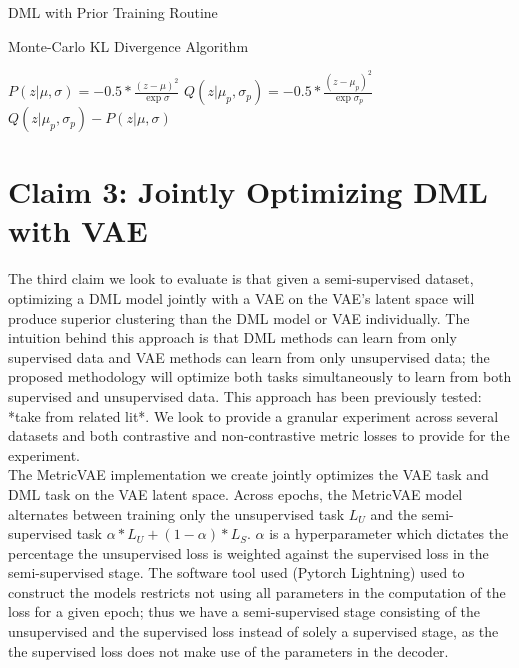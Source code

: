 \documentclass[./dissertation.tex]{subfiles}
\begin{document}
    \begin{algorithm}
    \caption{DML with Prior Training Routine}\label{alg:two}
    \end{algorithm}
    \begin{algorithm}
    \caption{Monte-Carlo KL Divergence Algorithm}\label{alg:two}
    $P(z|\mu, \sigma) = -0.5 * \frac{(z - \mu)^{2}}{\exp{\sigma}}$\;
    $Q(z|\mu_{p}, \sigma_{p}) = -0.5 * \frac{(z - \mu_{p})^{2}}{\exp{\sigma_{p}}}$\;
    \Return $Q(z|\mu_{p}, \sigma_{p}) - P(z|\mu, \sigma)$
    \end{algorithm}
    
    \section{Claim 3: Jointly Optimizing DML with VAE}
    The third claim we look to evaluate is that given a semi-supervised dataset, optimizing a DML model jointly with a VAE on the VAE’s latent space will produce superior clustering than the DML model or VAE individually. The intuition behind this approach is that DML methods can learn from only supervised data and VAE methods can learn from only unsupervised data; the proposed methodology will optimize both tasks simultaneously to learn from both supervised and unsupervised data. This approach has been previously tested: *take from related lit*. We look to provide a granular experiment across several datasets and both contrastive and non-contrastive metric losses to provide for the experiment.  \\
    
    The MetricVAE implementation we create jointly optimizes the VAE task and DML task on the VAE latent space. Across epochs, the MetricVAE model alternates between training only the unsupervised task $L_{U}$ and the semi-supervised task $\alpha * L_{U} + (1 - \alpha) * L_{S}$. $\alpha$ is a hyperparameter which dictates the percentage the unsupervised loss is weighted against the supervised loss in the semi-supervised stage. The software tool used (Pytorch Lightning) used to construct the models restricts not using all parameters in the computation of the loss for a given epoch; thus we have a semi-supervised stage consisting of the unsupervised and the supervised loss instead of solely a supervised stage, as the the supervised loss does not make use of the parameters in the decoder. 
    
\end{document}
